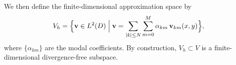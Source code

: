 \documentclass[a4paper,fleqn, 12pt]{cas-sc}
\numberwithin{table}{section}
\begin{document}
We then define the finite-dimensional approximation space by
\begin{equation}
	V_{h}
	=
	\Bigl\{
	\mathbf{v}\in L^{2}(D)\;\Big|\;
	\mathbf{v}
	=
	\sum_{|k|\leq N}\sum_{m=0}^{M}
	\alpha_{km}\,\mathbf{v}_{km}(x,y)
	\Bigr\},
	\label{space-fin}
\end{equation}
where $\{\alpha_{km}\}$ are the modal coefficients. By construction, $V_h\subset V$ is a finite-dimensional divergence-free subspace.






\end{document}
